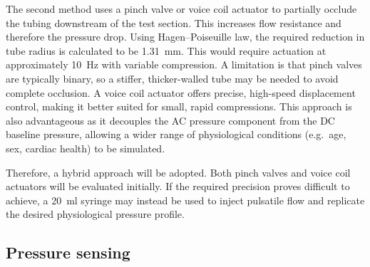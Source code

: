 \documentclass[10pt, a4paper]{article}
\begin{document}
The second method uses a pinch valve or voice coil actuator to partially occlude the tubing downstream of the test section. This increases flow resistance and therefore the pressure drop. Using Hagen--Poiseuille law, the required reduction in tube radius is calculated to be \qty{1.31}{\milli\metre}. This would require actuation at approximately \qty{10}{\hertz} with variable compression. A limitation is that pinch valves are typically binary, so a stiffer, thicker-walled tube may be needed to avoid complete occlusion. A voice coil actuator offers precise, high-speed displacement control, making it better suited for small, rapid compressions. This approach is also advantageous as it decouples the AC pressure component from the DC baseline pressure, allowing a wider range of physiological conditions (e.g.\ age, sex, cardiac health) to be simulated.

Therefore, a hybrid approach will be adopted. Both pinch valves and voice coil actuators will be evaluated initially. If the required precision proves difficult to achieve, a \qty{20}{\milli\litre} syringe may instead be used to inject pulsatile flow and replicate the desired physiological pressure profile.

\subsection{Pressure sensing}
\end{document}
